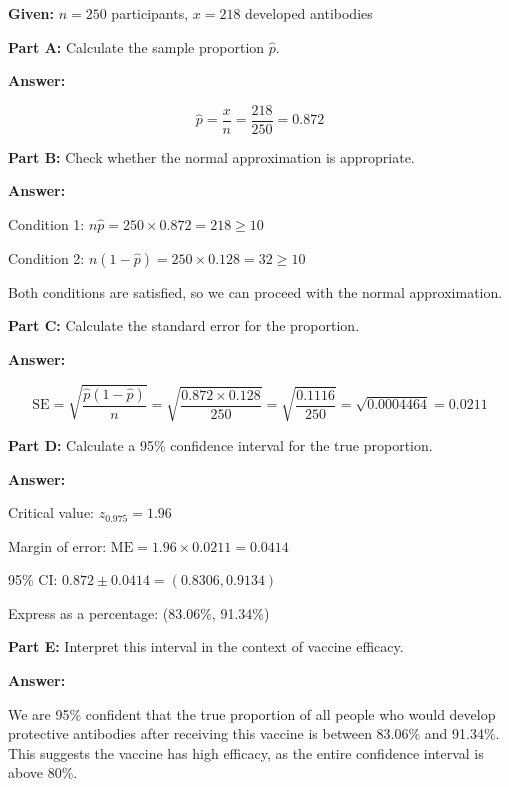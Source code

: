 \documentclass[11pt]{article}
\begin{document}
\textbf{Given:} $n = 250$ participants, $x = 218$ developed antibodies

\vspace{6pt}

\textbf{Part A:} Calculate the sample proportion $\hat{p}$.

\textcolor{answergreen}{\textbf{Answer:}}

$$\hat{p} = \frac{x}{n} = \frac{218}{250} = 0.872$$

\vspace{6pt}

\textbf{Part B:} Check whether the normal approximation is appropriate.

\textcolor{answergreen}{\textbf{Answer:}}

Condition 1: $n\hat{p} = 250 \times 0.872 = 218 \geq 10$ \checkmark

Condition 2: $n(1-\hat{p}) = 250 \times 0.128 = 32 \geq 10$ \checkmark

Both conditions are satisfied, so we can proceed with the normal approximation.

\vspace{6pt}

\textbf{Part C:} Calculate the standard error for the proportion.

\textcolor{answergreen}{\textbf{Answer:}}

$$\text{SE} = \sqrt{\frac{\hat{p}(1-\hat{p})}{n}} = \sqrt{\frac{0.872 \times 0.128}{250}} = \sqrt{\frac{0.1116}{250}} = \sqrt{0.0004464} = 0.0211$$

\vspace{6pt}

\textbf{Part D:} Calculate a 95\% confidence interval for the true proportion.

\textcolor{answergreen}{\textbf{Answer:}}

Critical value: $z_{0.975} = 1.96$

Margin of error: $\text{ME} = 1.96 \times 0.0211 = 0.0414$

95\% CI: $0.872 \pm 0.0414 = (0.8306, 0.9134)$

Express as a percentage: (83.06\%, 91.34\%)

\vspace{6pt}

\textbf{Part E:} Interpret this interval in the context of vaccine efficacy.

\textcolor{answergreen}{\textbf{Answer:}}

We are 95\% confident that the true proportion of all people who would develop protective antibodies after receiving this vaccine is between 83.06\% and 91.34\%. This suggests the vaccine has high efficacy, as the entire confidence interval is above 80\%.
\end{document}
